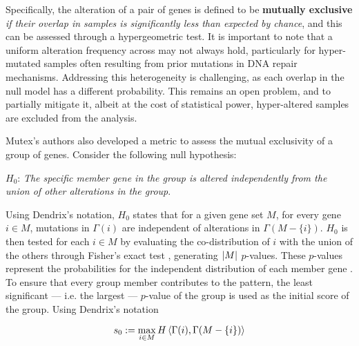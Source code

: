 Specifically, the alteration of a pair of genes is defined to be \textbf{mutually exclusive} \textit{if their overlap in samples is significantly less than expected by chance}, and this can be assessed through a hypergeometric test.  It is important to note that a uniform alteration frequency across may not always hold, particularly for hyper-mutated samples often resulting from prior mutations in DNA repair mechanisms. Addressing this heterogeneity is challenging, as each overlap in the null model has a different probability. This remains an open problem, and to partially mitigate it, albeit at the cost of statistical power, hyper-altered samples are excluded from the analysis. 

Mutex's authors also developed a metric to assess the mutual exclusivity of a group of genes. Consider the following null hypothesis:

\begin{displayquote}
    $H_0$: \textit{The specific member gene in the group is altered independently from the union of other alterations in the group}.
\end{displayquote}

Using Dendrix's notation, $H_0$ states that for a given gene set $M$, for every gene $i \in M$, mutations in $\Gamma(i)$ are independent of alterations in $\Gamma(M - \{i\})$. $H_0$ is then tested for each $i \in M$ by evaluating the co-distribution of $i$ with the union of the others through Fisher's exact test , generating $\left|M\right|$ $p$-values. These $p$-values represent the probabilities for the independent distribution of each member gene . To ensure that every group member contributes to the pattern, the least significant --- i.e. the largest --- $p$-value of the group is used as the initial score of the group. Using Dendrix's notation

\begin{equation}
    s_0 := \max_{i \in M} {H \left\langle\Gamma(i), \Gamma(M - \{i\})\right\rangle}
\end{equation}

